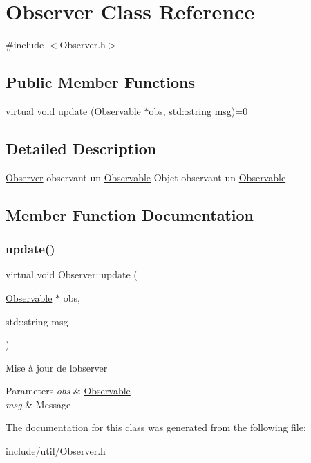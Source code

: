 \hypertarget{classObserver}{}\section{Observer Class Reference}
\label{classObserver}


{\ttfamily \#include $<$Observer.\+h$>$}

\subsection*{Public Member Functions}
\begin{DoxyCompactItemize}
\item 
virtual void \hyperlink{classObserver_afc0ff8fce4ae7030ef11afe3e3cae363}{update} (\hyperlink{classObservable}{Observable} $\ast$obs, std\+::string msg)=0
\end{DoxyCompactItemize}


\subsection{Detailed Description}
\hyperlink{classObserver}{Observer} observant un \hyperlink{classObservable}{Observable} Objet observant un \hyperlink{classObservable}{Observable} 

\subsection{Member Function Documentation}
\mbox{\label{classObserver_afc0ff8fce4ae7030ef11afe3e3cae363}} 
\subsubsection{\texorpdfstring{update()}{update()}}
{\footnotesize\ttfamily virtual void Observer\+::update (\begin{DoxyParamCaption}\item[{\hyperlink{classObservable}{Observable} $\ast$}]{obs,  }\item[{std\+::string}]{msg }\end{DoxyParamCaption})\hspace{0.3cm}{\ttfamily [pure virtual]}}

Mise à jour de l\textquotesingle{}observer


\begin{DoxyParams}{Parameters}
{\em obs} & \hyperlink{classObservable}{Observable} \\
\hline
{\em msg} & Message \\
\hline
\end{DoxyParams}


The documentation for this class was generated from the following file\+:\begin{DoxyCompactItemize}
\item 
include/util/Observer.\+h\end{DoxyCompactItemize}
